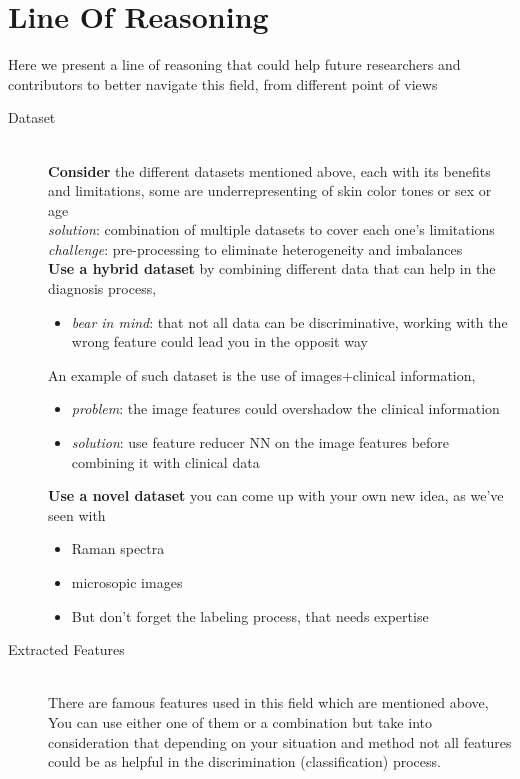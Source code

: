 \section{Line Of Reasoning}
    Here we present a line of reasoning that could help future researchers and contributors to better navigate this field, from different point of views 
    \begin{description}
        \item[Dataset] \hfill \\
            \textbf{Consider} the different datasets mentioned above, each with its benefits and limitations, some are underrepresenting of skin color tones or sex or age \\
            \emph{solution}: combination of multiple datasets to cover each one's limitations \\
            \emph{challenge}: pre-processing to eliminate heterogeneity and imbalances \\

            \textbf{Use a hybrid dataset} by combining different data that can help in the diagnosis process, \\
            \begin{itemize}
                \item \emph{bear in mind}:  that not all data can be discriminative, working with the wrong feature could lead you in the opposit way 
            \end{itemize}
            An example of such dataset is the use of  images+clinical information, \\
            \begin{itemize}
                \item \emph{problem}: the image features could overshadow the clinical information \\
                \item \emph{solution}: use feature reducer NN on the image features before combining it with clinical data \\ 
            \end{itemize}
                
            \textbf{Use a novel dataset} you can come up with your own new idea, as we've seen with
                \begin{itemize}
                    \item Raman spectra
                    \item microsopic images
                    \item But don't forget the labeling process, that needs expertise
                \end{itemize}
        \item[Extracted Features] \hfill \\ 
            There are famous features used in this field which are mentioned above, You can use either one of them or a combination but take into consideration that depending on your situation and method not all features could be as helpful in the discrimination (classification) process.
            

\end{description}
